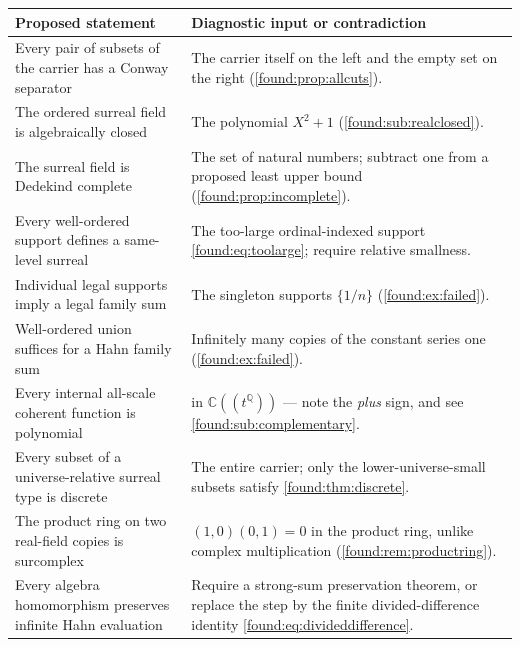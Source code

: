 \documentclass[11pt,letterpaper]{article}
\numberwithin{equation}{section}
\theoremstyle{definition}
\theoremstyle{remark}
\newcommand{\C}{\mathbb C}
\newcommand{\Q}{\mathbb Q}
\begin{document}
\begin{longtable}{@{}P{0.36\textwidth}P{0.57\textwidth}@{}}
\toprule
Proposed statement & Diagnostic input or contradiction\\
\midrule\endhead
Every pair of subsets of the carrier has a Conway separator & The carrier itself on the left and the empty set on the right (\cref{found:prop:allcuts}).\\[0.45em]
The ordered surreal field is algebraically closed & The polynomial $X^2+1$ (\cref{found:sub:realclosed}).\\[0.45em]
The surreal field is Dedekind complete & The set of natural numbers; subtract one from a proposed least upper bound (\cref{found:prop:incomplete}).\\[0.45em]
Every well-ordered support defines a same-level surreal & The too-large ordinal-indexed support \eqref{found:eq:toolarge}; require relative smallness.\\[0.45em]
Individual legal supports imply a legal family sum & The singleton supports $\{1/n\}$ (\cref{found:ex:failed}).\\[0.45em]
Well-ordered union suffices for a Hahn family sum & Infinitely many copies of the constant series one (\cref{found:ex:failed}).\\[0.45em]
Every internal all-scale coherent function is polynomial &  in $\C((t^\Q))$ --- note the \emph{plus} sign, and see \cref{found:sub:complementary}.\\[0.45em]
Every subset of a universe-relative surreal type is discrete & The entire carrier; only the lower-universe-small subsets satisfy \cref{found:thm:discrete}.\\[0.45em]
The product ring on two real-field copies is surcomplex & $(1,0)(0,1)=0$ in the product ring, unlike complex multiplication (\cref{found:rem:productring}).\\[0.45em]
Every algebra homomorphism preserves infinite Hahn evaluation & Require a strong-sum preservation theorem, or replace the step by the finite divided-difference identity \eqref{found:eq:divideddifference}.\\
\bottomrule
\end{longtable}
\end{document}

